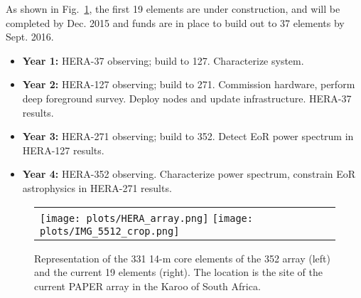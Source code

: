 \documentclass[preprint,11pt]{aastex}
\begin{document}
As shown in Fig.~\ref{fig:HERA_array}, the first 19 elements are under construction, and will be completed by Dec. 2015 and funds are in place to build out to 37 elements by Sept. 2016.  
\vspace{-8pt}
\begin{itemize}\setlength{\parskip}{0pt}\itemsep0pt
   \item {\bf Year 1:} HERA-37 observing; build to 127.  Characterize system.
   \item {\bf Year 2:} HERA-127 observing; build to 271.  Commission hardware, perform  deep foreground survey.  Deploy nodes and update infrastructure. HERA-37 results.
   \item {\bf Year 3:} HERA-271 observing; build to 352. Detect EoR power spectrum in HERA-127 results.
   \item {\bf Year 4:} HERA-352 observing. Characterize power spectrum, constrain EoR astrophysics in HERA-271 results.
\end{itemize}
\vspace{-10pt}


\begin{figure}[tbh!]
	\begin{tabular}{ll}
	\begin{minipage}{5in}
	  \texttt{[image: plots/HERA\_array.png]}
	\texttt{[image: plots/IMG\_5512\_crop.png]}
	\end{minipage} & 
	\hspace{-0.1in}
	\begin{minipage}{1.3in}
	\caption{Representation of the 331 14-m core elements of the 352 array (left) and the current 19 elements (right).  The location is the site of the current PAPER array in the Karoo of South Africa.}
	\label{fig:HERA_array}
	\end{minipage}
	\end{tabular}
	\vspace{-11pt}
\end{figure}
\end{document}

